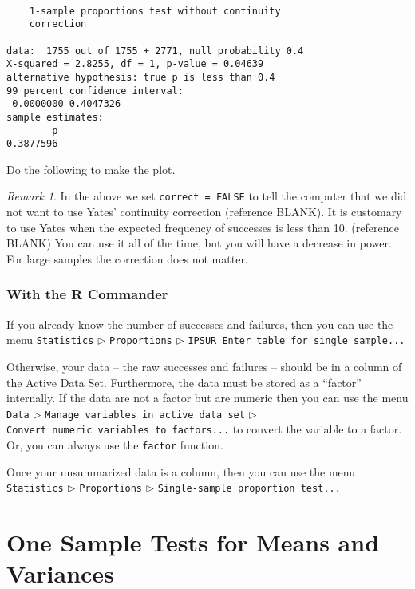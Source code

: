 \documentclass[]{book}
\numberwithin{equation}{chapter}
\numberwithin{figure}{chapter}
\theoremstyle{plain}
\theoremstyle{definition}
\theoremstyle{remark}
\theoremstyle{definition}
\theoremstyle{definition}
\theoremstyle{remark}
\newtheorem*{remark}{Remark}
\begin{document}
\begin{verbatim}

    1-sample proportions test without continuity
    correction

data:  1755 out of 1755 + 2771, null probability 0.4
X-squared = 2.8255, df = 1, p-value = 0.04639
alternative hypothesis: true p is less than 0.4
99 percent confidence interval:
 0.0000000 0.4047326
sample estimates:
        p 
0.3877596 
\end{verbatim}

Do the following to make the plot.

\bigskip

\begin{remark}
In the above we set \texttt{correct\ =\ FALSE} to tell the computer that
we did not want to use Yates' continuity correction (reference BLANK).
It is customary to use Yates when the expected frequency of successes is
less than 10. (reference BLANK) You can use it all of the time, but you
will have a decrease in power. For large samples the correction does not
matter.
\end{remark}

\subsubsection{With the R Commander}\label{with-the-r-commander}

If you already know the number of successes and failures, then you can
use the menu \texttt{Statistics} \(\triangleright\) \texttt{Proportions}
\(\triangleright\) \texttt{IPSUR\ Enter\ table\ for\ single\ sample...}

Otherwise, your data -- the raw successes and failures -- should be in a
column of the Active Data Set. Furthermore, the data must be stored as a
``factor'' internally. If the data are not a factor but are numeric then
you can use the menu \texttt{Data} \(\triangleright\)
\texttt{Manage\ variables\ in\ active\ data\ set} \(\triangleright\)
\texttt{Convert\ numeric\ variables\ to\ factors...} to convert the
variable to a factor. Or, you can always use the \texttt{factor}
function.

Once your unsummarized data is a column, then you can use the menu
\texttt{Statistics} \(\triangleright\) \texttt{Proportions}
\(\triangleright\) \texttt{Single-sample\ proportion\ test...}

\section{One Sample Tests for Means and
Variances}\label{sec-one-sample-tests}
\end{document}
